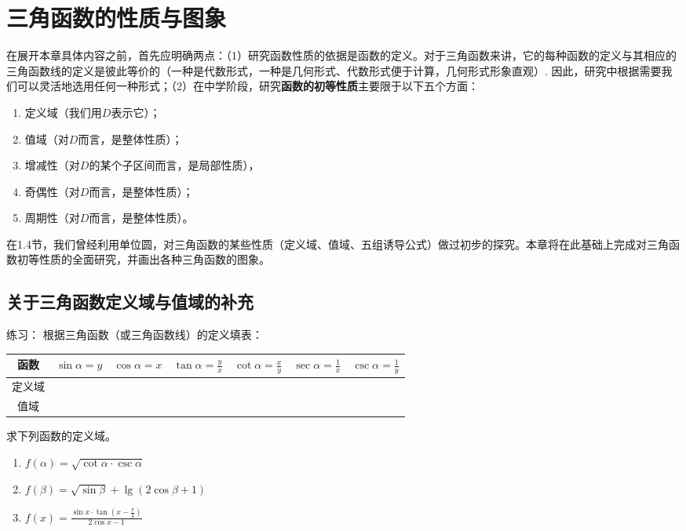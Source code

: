 \chapter{三角函数的性质与图象}

在展开本章具体内容之前，首先应明确两点：（1）研究函数性质的依据是函数的定义。对于三角函数来讲，它的每种函数的定义与其相应的三角函数线的定义是彼此等价的（一种是代数形式，一种是几何形式、代数形式便于计算，几何形式形象直观）. 因此，研究中根据需要我们可以灵活地选用任何一种形式；（2）在中学阶段，研究\textbf{函数的初等性质}主要限于以下五个方面：
\begin{enumerate}
    \item 定义域（我们用$D$表示它）；
    \item 值域（对$D$而言，是整体性质）；
    \item 增减性（对$D$的某个子区间而言，是局部性质），
    \item 奇偶性（对$D$而言，是整体性质）；
    \item 周期性（对$D$而言，是整体性质）。
\end{enumerate}

在1.4节，我们曾经利用单位圆，对三角函数的某些性质（定义域、值域、五组诱导公式）做过初步的探究。本章将在此基础上完成对三角函数初等性质的全面研究，并画出各种三角函数的图象。

\section{关于三角函数定义域与值域的补充}

{练习}：
 根据三角函数（或三角函数线）的定义填表：
\begin{center}
\begin{tabular}{c|c|c|c|c|c|c}
\hline
函数 & $\sin\alpha=y$&$\cos\alpha=x$& $\tan\alpha=\frac{y}{x}$&$\cot\alpha=\frac{x}{y}$&$\sec\alpha=\frac{1}{x}$&$\csc\alpha=\frac{1}{y}$\\
\hline
定义域&&&&&\\
\hline
值域&&&&&\\
\hline
\end{tabular}
\end{center}    

\begin{example}
    求下列函数的定义域。
\begin{multicols}{2}
\begin{enumerate}[(1)]
    \item $f(\alpha)=\sqrt{\cot\alpha\cdot\csc\alpha}$
    \item $f( \beta ) = \sqrt {\sin \beta }+\lg(2\cos\beta+1)$
    \item $f( x) = \frac {\sin x\cdot \tan \left ( x- \frac \pi 4\right ) }{2\cos x- 1}$
\end{enumerate}    
\end{multicols}

\end{example}

